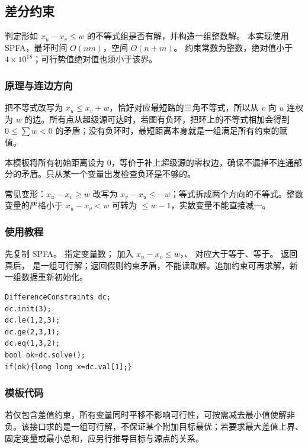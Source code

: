 \subsection{差分约束}
\label{algo:difference-constraints}
\AlgorithmInfo
    {判定形如 $x_u-x_v\leq w$ 的不等式组是否有解，并构造一组整数解。}
    {本实现使用 SPFA，最坏时间 $O(nm)$，空间 $O(n+m)$。}
    {约束常数为整数，绝对值小于 $4\times10^{18}$；可行势值绝对值也须小于该界。}

\subsubsection*{原理与连边方向}
把不等式改写为 $x_u\leq x_v+w$，恰好对应最短路的三角不等式，所以从 $v$ 向 $u$ 连权为 $w$ 的边。所有点从超级源可达时，若图有负环，把环上的不等式相加会得到 $0\leq\sum w<0$ 的矛盾；没有负环时，最短距离本身就是一组满足所有约束的赋值。

本模板将所有初始距离设为 $0$，等价于补上超级源的零权边，确保不漏掉不连通部分的矛盾。只从某一个变量出发检查负环是不够的。

常见变形：$x_u-x_v\geq w$ 改写为 $x_v-x_u\leq-w$；等式拆成两个方向的不等式。整数变量的严格小于 $x_u-x_v<w$ 可转为 $\leq w-1$，实数变量不能直接减一。

\subsubsection*{使用教程}
先复制 SPFA。 指定变量数； 加入 $x_u-x_v\le w$，、 对应大于等于、等于。 返回真后， 是一组可行解；返回假则约束矛盾，不能读取解。追加约束可再求解，新一组数据重新初始化。
\begin{lstlisting}[style=mtycpp,numbers=none]
DifferenceConstraints dc;
dc.init(3);
dc.le(1,2,3);
dc.ge(2,3,1);
dc.eq(1,3,2);
bool ok=dc.solve();
if(ok){long long x=dc.val[1];}
\end{lstlisting}

\subsubsection*{模板代码}

若仅包含差值约束，所有变量同时平移不影响可行性，可按需减去最小值使解非负。该接口求的是一组可行解，不保证某个附加目标最优；若要求最大差值上界、固定变量或最小总和，应另行推导目标与源点的关系。
